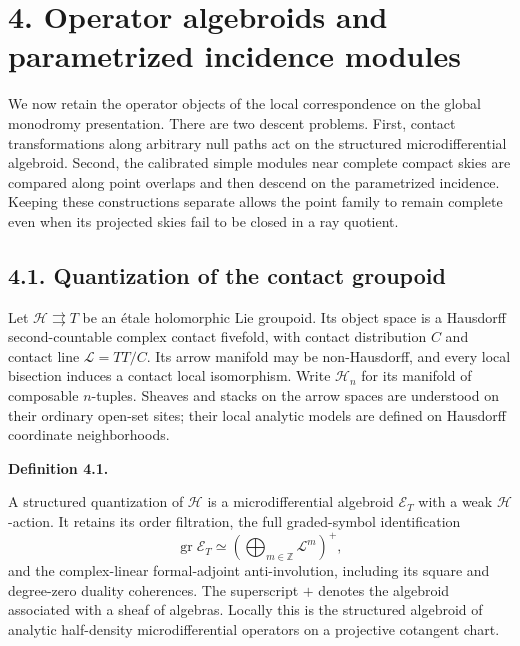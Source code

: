 \documentclass[
  english,
  11pt,
  reqno]{amsart}
\makeatletter
\newcommand{\pandocstatementheading}[1]{%
  \par\addpenalty{\@beginparpenalty}%
  \addvspace{.5\baselineskip plus .2\baselineskip minus .2\baselineskip}%
  {\normalfont\bfseries #1\par}%
  \nobreak\@afterindenttrue\@afterheading
}
\makeatother
\begin{document}
\protect{}\label{sec:operator-incidence-v08}

\section{4. Operator algebroids and parametrized incidence
modules}\label{operator-algebroids-and-parametrized-incidence-modules}

We now retain the operator objects of the local correspondence on the
global monodromy presentation. There are two descent problems. First,
contact transformations along arbitrary null paths act on the structured
microdifferential algebroid. Second, the calibrated simple modules near
complete compact skies are compared along point overlaps and then
descend on the parametrized incidence. Keeping these constructions
separate allows the point family to remain complete even when its
projected skies fail to be closed in a ray quotient.

\protect{}\label{sec:operator-contact-quantization-v08}

\subsection{4.1. Quantization of the contact
groupoid}\label{quantization-of-the-contact-groupoid}

Let \(\mathcal H\rightrightarrows T\) be an étale holomorphic Lie
groupoid. Its object space is a Hausdorff second-countable complex
contact fivefold, with contact distribution \(C\) and contact line
\(\mathcal L=TT/C\). Its arrow manifold may be non-Hausdorff, and every
local bisection induces a contact local isomorphism. Write
\(\mathcal H_n\) for its manifold of composable \(n\)-tuples. Sheaves
and stacks on the arrow spaces are understood on their ordinary open-set
sites; their local analytic models are defined on Hausdorff coordinate
neighborhoods.

\pandocstatementheading{\protect{}\label{def:structured-contact-groupoid-quantization}Definition 4.1.}

A structured quantization of \(\mathcal H\) is a microdifferential
algebroid \(\mathscr E_T\) with a weak \(\mathcal H\)-action. It retains
its order filtration, the full graded-symbol identification \[
\operatorname{gr}\mathscr E_T
\simeq\left(\bigoplus_{m\in\mathbb Z}\mathcal L^m\right)^+,
\] and the complex-linear formal-adjoint anti-involution, including its
square and degree-zero duality coherences. The superscript \(+\) denotes
the algebroid associated with a sheaf of algebras. Locally this is the
structured algebroid of analytic half-density microdifferential
operators on a projective cotangent chart.
\end{document}
